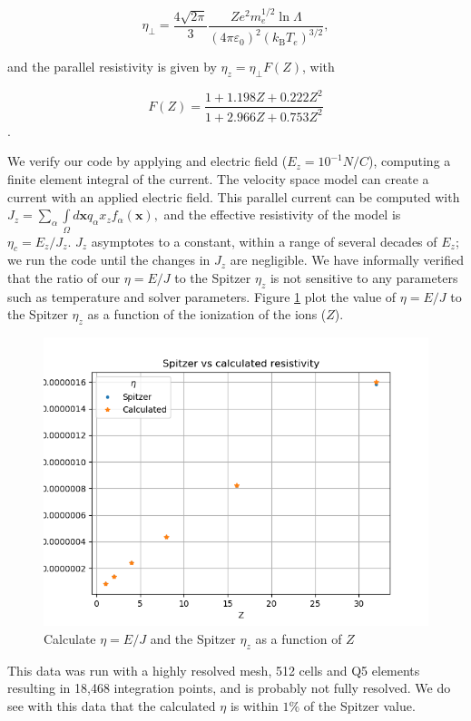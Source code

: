 \documentclass[12pt]{siamart}
\begin{document}
$${ \eta _{\perp }={\frac {4{\sqrt {2\pi }}}{3}}{\frac {Ze^{2}m_{e}^{1/2}\ln \Lambda }{\left(4\pi \varepsilon _{0}\right)^{2}\left(k_{\text{B}}T_{e}\right)^{3/2}}},}$$

and the parallel resistivity is given by $ {\eta_{z} = \eta _{\perp} F(Z)} $, with

$${ F(Z)={\frac {1+1.198Z+0.222Z^{2}}{1+2.966Z+0.753Z^{2}}}}$$.

We verify our code by applying and electric field ($E_{z}=10^{-1} N/C$), computing a finite element integral of the current.
The velocity space model can create a current with an applied electric field.
This parallel current can be computed with $ J_z =\sum_{\alpha} \int \limits_{\Omega}d\bm{x} q_\alpha x_{z} f_\alpha(\bm{{x}}), $ and the effective resistivity of the model is $\eta_c = E_{z}/J_{z}$.
$J_{z}$ asymptotes to a constant, within a range of several decades of $E_{z}$; we run the code until the changes in $J_{z}$ are negligible.
We have informally verified that the ratio of our $\eta = E/J$ to the Spitzer $\eta_z$  is not sensitive to any parameters such as temperature and solver parameters.
Figure \ref{fig:z} plot the value of  $\eta = E/J$ to the Spitzer $\eta_z$ as a function of the ionization of the ions ($Z$).
\begin{figure}[htbp]
\begin{center}
\includegraphics[width=.9\linewidth]{spitzer_calc_eta_Z.png}
\caption{Calculate $\eta = E/J$ and the Spitzer $\eta_z$ as a function of $Z$}
\label{fig:z}
\end{center}
\end{figure}
This data was run with a highly resolved mesh, 512 cells and Q5 elements resulting in 18,468 integration points, and is probably not fully resolved.
We do see with this data that the calculated $\eta$ is within $1\%$ of the Spitzer value.
\end{document}

